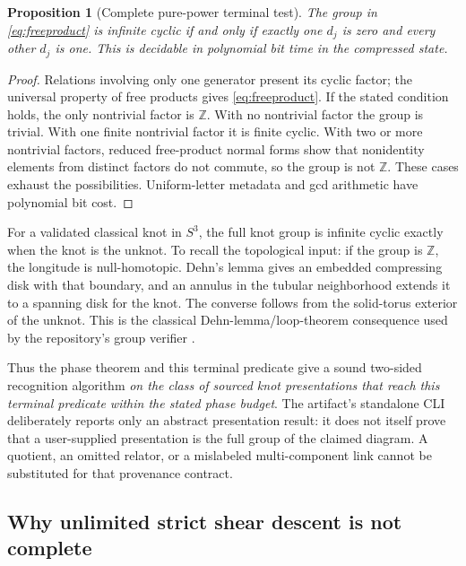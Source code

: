 \documentclass[11pt,letterpaper]{article}
\newtheorem{proposition}[theorem]{Proposition}
\theoremstyle{definition}
\theoremstyle{remark}\newtheorem{remark}[theorem]{Remark}
\newcommand{\Z}{\mathbb Z}
\begin{document}
\begin{proposition}[Complete pure-power terminal test]
The group in \eqref{eq:freeproduct} is infinite cyclic if and only if exactly
one $d_j$ is zero and every other $d_j$ is one. This is decidable in polynomial
bit time in the compressed state.
\end{proposition}
\begin{proof}
Relations involving only one generator present its cyclic factor; the
universal property of free products gives \eqref{eq:freeproduct}. If the
stated condition holds, the only nontrivial factor is $\Z$. With no
nontrivial factor the group is trivial. With one finite nontrivial factor
it is finite cyclic. With two or more nontrivial factors, reduced free-product
normal forms show that nonidentity elements from distinct factors do not
commute, so the group is not $\Z$. These cases exhaust the possibilities.
Uniform-letter metadata and gcd arithmetic have polynomial bit cost.
\end{proof}

For a validated classical knot in $S^3$, the full knot group is infinite
cyclic exactly when the knot is the unknot. To recall the topological input:
if the group is $\Z$, the longitude is null-homotopic. Dehn's lemma gives an
embedded compressing disk with that boundary, and an annulus in the tubular
neighborhood extends it to a spanning disk for the knot. The converse follows
from the solid-torus exterior of the unknot. This is the classical
Dehn-lemma/loop-theorem consequence used by the repository's group verifier
\cite{papa,proveit}.

Thus the phase theorem and this terminal predicate give a sound two-sided
recognition algorithm \emph{on the class of sourced knot presentations that
reach this terminal predicate within the stated phase budget}. The artifact's
standalone CLI deliberately reports only an abstract presentation result:
it does not itself prove that a user-supplied presentation is the full group
of the claimed diagram. A quotient, an omitted relator, or a mislabeled
multi-component link cannot be substituted for that provenance contract.

\subsection{Why unlimited strict shear descent is not complete}
\end{document}
